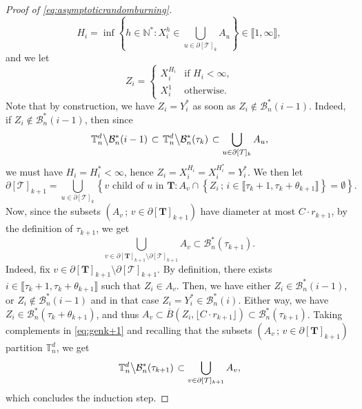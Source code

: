 \documentclass[a4paper,11pt]{article}
\begin{document}
\begin{proof}[Proof of \eqref{eq:asymptoticrandomburning}]
\[H_i=\inf\left\{h\in\mathbb{N}^*:X_i^h\in\bigcup_{u\in\partial[\mathcal{T}]_k}A_u\right\}\in\llbracket1,\infty\rrbracket,\]
and we let
\[Z_i=\begin{cases}
X_i^{H_i}&\text{if $H_i<\infty$,}\\
X_i^1&\text{otherwise.}
\end{cases}\]
Note that by construction, we have $Z_i=Y_i^*$ as soon as $Z_i\notin\mathcal{B}_n^*(i-1)$.
Indeed, if $Z_i\notin\mathcal{B}_n^*(i-1)$, then since
\[\left.\mathbb{T}_n^d\middle\backslash\mathcal{B}_n^*(i-1)\right.\subset\left.\mathbb{T}_n^d\middle\backslash\mathcal{B}_n^*(\tau_k)\right.\subset\bigcup_{u\in\partial[\mathcal{T}]_k}A_u,\]
we must have $H_i=H_i^*<\infty$, hence $Z_i=X_i^{H_i}=X_i^{H_i^*}=Y_i^*$.
We then let
\[\partial[\mathcal{T}]_{k+1}=\bigcup_{u\in\partial[\mathcal{T}]_k}\left\{\text{$v$ child of $u$ in $\mathbf{T}$}:A_v\cap\left\{Z_i\,;\,i\in\llbracket\tau_k+1,\tau_k+\theta_{k+1}\rrbracket\right\}=\emptyset\right\}.\]
Now, since the subsets ${(A_v\,;\,v\in\partial[\mathbf{T}]_{k+1})}$ have diameter at most $C\cdot r_{k+1}$, by the definition of $\tau_{k+1}$, we get
\begin{equation}\label{eq:genk+1}
\bigcup_{v\in\partial[\mathbf{T}]_{k+1}\setminus\partial[\mathcal{T}]_{k+1}}A_v\subset\mathcal{B}_n^*(\tau_{k+1}).
\end{equation}
Indeed, fix $v\in\partial[\mathbf{T}]_{k+1}\setminus\partial[\mathcal{T}]_{k+1}$.
By definition, there exists $i\in\llbracket\tau_k+1,\tau_k+\theta_{k+1}\rrbracket$ such that $Z_i\in A_v$.
Then, we have either $Z_i\in\mathcal{B}_n^*(i-1)$, or $Z_i\notin\mathcal{B}_n^*(i-1)$ and in that case $Z_i=Y_i^*\in\mathcal{B}_n^*(i)$.
Either way, we have $Z_i\in\mathcal{B}_n^*(\tau_k+\theta_{k+1})$, and thus $A_v\subset\overline{B}(Z_i,\lfloor C\cdot r_{k+1}\rfloor)\subset\mathcal{B}_n^*(\tau_{k+1})$.
Taking complements in \eqref{eq:genk+1} and recalling that the subsets $\left(A_v\,;\,v\in\partial[\mathbf{T}]_{k+1}\right)$ partition $\mathbb{T}_n^d$, we get
\[\left.\mathbb{T}_n^d\middle\backslash\mathcal{B}_n^*(\tau_{k+1})\right.\subset\bigcup_{v\in\partial[\mathcal{T}]_{k+1}}A_v,\]
which concludes the induction step.


\end{proof}
\end{document}
